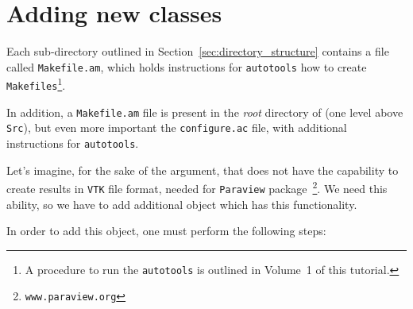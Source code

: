 \section{Adding new classes}
\label{sec:adding_new_classes}

Each sub-directory outlined in Section~\ref{sec:directory_structure} contains 
a file called {\tt Makefile.am}, which holds instructions for {\tt autotools} 
how to create {\tt Makefiles}\footnote{A procedure to run the {\tt autotools} 
is outlined in Volume~1 of this tutorial.}.

In addition, a {\tt Makefile.am} file is present in the {\em root} directory
of {\psiboil} (one level above {\tt Src}), but even more important the 
{\tt configure.ac} file, with additional instructions for {\tt autotools}.

Let's imagine, for the sake of the argument, that {\psiboil} does not have
the capability to create results in {\tt VTK} file format, needed for
{\tt Paraview} package~\footnote{{\tt www.paraview.org}}. We need this
ability, so we have to add additional object which has this functionality.

In order to add this object, one must perform the following steps:

